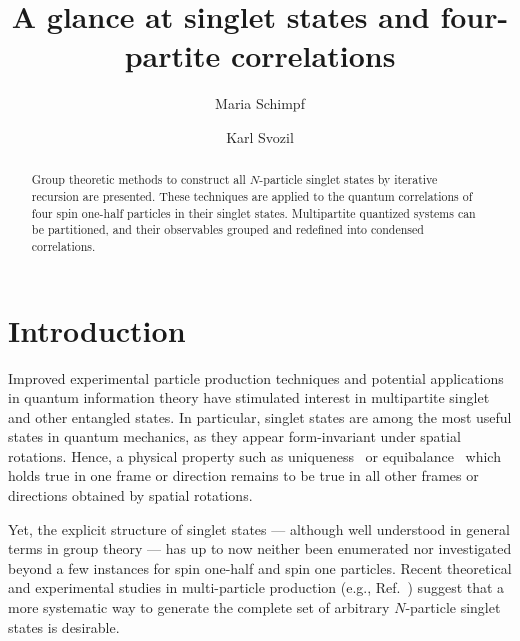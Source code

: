 \documentclass[rmp,amsfonts,showpacs,showkeys,preprint]{revtex4}
\begin{document}



\title{A glance at singlet states and four-partite correlations}

\author{Maria Schimpf}
\author{Karl Svozil}


\begin{abstract}
Group theoretic methods to construct all $N$-particle singlet states by iterative recursion are presented.
These techniques are applied to the quantum correlations of four spin one-half particles in their singlet states.
Multipartite quantized systems can be partitioned, and their observables grouped and redefined into condensed correlations.
\end{abstract}





\maketitle

\tableofcontents
\newpage

\section{Introduction}

Improved experimental particle production techniques
and potential applications in quantum information theory
have stimulated interest in
multipartite singlet and other entangled states.
In particular, singlet states are among the most useful states in quantum
mechanics, as they appear form-invariant under spatial rotations.
Hence, a physical property such as uniqueness~\cite{svozil-2006-uniquenessprinciple}
or equibalance~\cite{zeil-99}
which holds true in one frame or direction
remains to be true in all other frames or directions obtained by spatial rotations.

Yet, the explicit structure of singlet states  ---  although well understood
in general terms in group theory  ---  has up to now neither been
enumerated nor investigated beyond a few instances for
spin one-half and spin one particles. Recent theoretical and
experimental studies in multi-particle production (e.g.,
Ref.~\cite{egbkzw}) suggest that a more systematic way to generate
the complete set of arbitrary $N$-particle singlet states is desirable.
\end{document}

